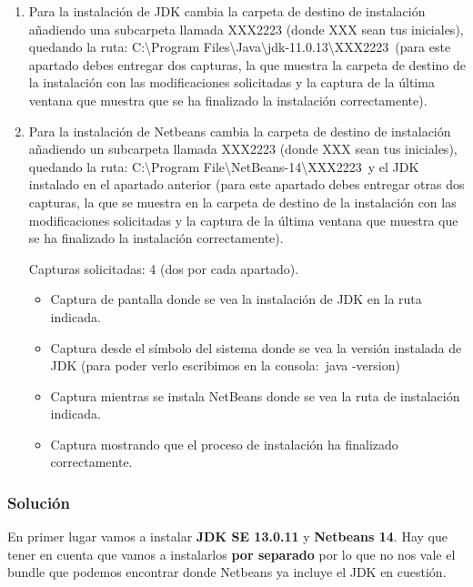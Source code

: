 \begin{enumerate}[label=(\alph*)]
    \item Para la instalación de JDK cambia la carpeta de destino de instalación añadiendo una subcarpeta llamada XXX2223 (donde XXX sean tus iniciales), quedando la ruta: C:\textbackslash Program Files\textbackslash Java\textbackslash jdk-11.0.13\textbackslash XXX2223\ (para este apartado debes entregar dos capturas, la que muestra la carpeta de destino de la instalación con las modificaciones solicitadas y la captura de la última ventana que muestra que se ha finalizado la instalación correctamente).
    \item Para la instalación de Netbeans cambia la carpeta de destino de instalación añadiendo un subcarpeta llamada XXX2223 (donde XXX sean tus iniciales), quedando la ruta: C:\textbackslash Program File\textbackslash NetBeans-14\textbackslash XXX2223\ y el JDK instalado en el apartado anterior (para este apartado debes entregar otras dos capturas, la que se muestra en la carpeta de destino de la instalación con las modificaciones solicitadas y la captura de la última ventana que muestra que se ha finalizado la instalación correctamente).

    Capturas solicitadas: 4 (dos por cada apartado).
    \begin{itemize}
        \item Captura de pantalla donde se vea la instalación de JDK en la ruta indicada.
        \item Captura desde el símbolo del sistema donde se vea la versión instalada de JDK (para poder verlo escribimos en la consola: java -version)
        \item Captura mientras se instala NetBeans donde se vea la ruta de instalación indicada.
        \item Captura mostrando que el proceso de instalación ha finalizado correctamente.
    \end{itemize}
\end{enumerate}

\subsubsection{Solución}
En primer lugar vamos a instalar \textbf{JDK SE 13.0.11} y \textbf{Netbeans 14}. Hay que tener en cuenta que vamos a instalarlos \textbf{por separado} por lo que no nos vale el bundle que podemos encontrar donde Netbeans ya incluye el JDK en cuestión.

